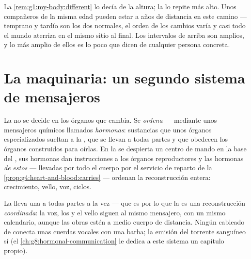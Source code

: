 \begin{remark}\label{rem:g8:puberty:timetable}
La \cref{rem:g1:my-body:different} lo decía de la altura; la 
lo repite más alto. Unos compañeros de la misma edad pueden estar a
años de distancia en este camino --- temprano y tardío son los dos
normales, el orden de los cambios varía y casi todo el mundo aterriza
en el mismo sitio al final. Los intervalos de arriba son amplios, y lo
más amplio de ellos es lo poco que dicen de cualquier persona concreta.
\end{remark}

\section{La maquinaria: un segundo sistema de mensajeros}

\begin{definition}\label{def:g8:puberty:hormones}
La  no se decide en los órganos que cambia. Se \emph{ordena}
--- mediante unos mensajeros químicos llamados
\emph{hormonas}: sustancias que unos órganos
especializados sueltan a la \emph{}, que se llevan a todas
partes y que obedecen los órganos construidos para oírlas. En la
 se despierta un centro de mando en la base del , sus
hormonas dan instrucciones a los órganos reproductores y las hormonas
\emph{de estos} --- llevadas por todo el cuerpo por el servicio de
reparto de la \cref{prop:g4:heart-and-blood:carries} --- ordenan la
reconstrucción entera: crecimiento, vello, voz, ciclos.
\end{definition}

\begin{example}\label{ex:g8:puberty:sites}
La  lleva una  a todas partes a la vez --- que es por lo
que la  es una reconstrucción \emph{coordinada}: la voz, los
 y el vello siguen al mismo mensajero, con un mismo calendario,
aunque las obras estén a medio cuerpo de distancia. Ningún cableado de
 conecta unas cuerdas vocales con una barba; la emisión del
torrente sanguíneo sí (el \cref{ch:g8:hormonal-communication} le dedica
a este sistema un capítulo propio).
\end{example}

